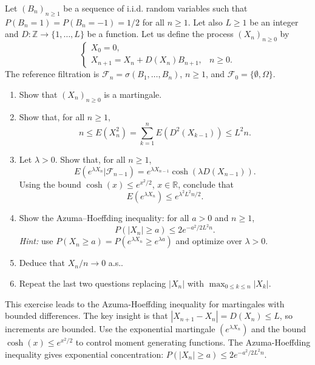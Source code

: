 \begin{exercise}
Let \((B_n)_{n \geq 1}\) be a sequence of i.i.d. random variables such that \(P(B_n = 1) = P(B_n = -1) = 1/2\) for all \(n \geq 1\). Let also \(L \geq 1\) be an integer and \(D : \mathbb{Z} \to \{1, \ldots, L\}\) be a function. Let us define the process \((X_n)_{n \geq 0}\) by
\[\begin{cases}
X_0 = 0, \\
X_{n+1} = X_n + D(X_n)B_{n+1}, & n \geq 0.
\end{cases}\]
The reference filtration is \(\mathcal{F}_n = \sigma(B_1, \ldots, B_n)\), \(n \geq 1\), and \(\mathcal{F}_0 = \{\emptyset, \Omega\}\).
\begin{enumerate}
    \item Show that \((X_n)_{n \geq 0}\) is a martingale.

    \item Show that, for all \(n \geq 1\),
    \[n \leq E(X_n^2) = \sum_{k=1}^n E(D^2(X_{k-1})) \leq L^2n.\]

    \item Let \(\lambda > 0\). Show that, for all \(n \geq 1\),
    \[E(e^{\lambda X_n}|\mathcal{F}_{n-1}) = e^{\lambda X_{n-1}} \cosh(\lambda D(X_{n-1})).\]
    Using the bound \(\cosh(x) \leq e^{x^2/2}\), \(x \in \mathbb{R}\), conclude that
    \[E(e^{\lambda X_n}) \leq e^{\lambda^2 L^2 n/2}.\]

    \item Show the Azuma–Hoeffding inequality: for all \(a > 0\) and \(n \geq 1\),
    \[P(|X_n| \geq a) \leq 2e^{-a^2/2L^2n}.\]
    \textit{Hint:} use \(P(X_n \geq a) = P(e^{\lambda X_n} \geq e^{\lambda a})\) and optimize over \(\lambda > 0\).

    \item Deduce that \(X_n/n \to 0\) a.s..

    \item Repeat the last two questions replacing \(|X_n|\) with \(\max_{0 \leq k \leq n} |X_k|\).
\end{enumerate}

\begin{reminder}
This exercise leads to the Azuma-Hoeffding inequality for martingales with bounded differences. The key insight is that \(|X_{n+1} - X_n| = D(X_n) \leq L\), so increments are bounded. Use the exponential martingale \((e^{\lambda X_n})\) and the bound \(\cosh(x) \leq e^{x^2/2}\) to control moment generating functions. The Azuma-Hoeffding inequality gives exponential concentration: \(P(|X_n| \geq a) \leq 2e^{-a^2/2L^2n}\).
\end{reminder}
\end{exercise}

